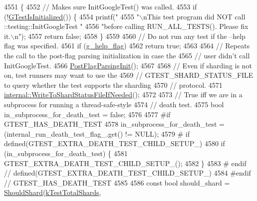 \begin{DoxyCode}
4551                                \{
4552   \textcolor{comment}{// Makes sure InitGoogleTest() was called.}
4553   \textcolor{keywordflow}{if} (!\hyperlink{namespacetesting_1_1internal_a91e707e0d371fae0224ffd37f0d042af}{GTestIsInitialized}()) \{
4554     printf(\textcolor{stringliteral}{"%
4555            \textcolor{stringliteral}{"\(\backslash\)nThis test program did NOT call ::testing::InitGoogleTest "}
4556            \textcolor{stringliteral}{"before calling RUN\_ALL\_TESTS().  Please fix it.\(\backslash\)n"});
4557     \textcolor{keywordflow}{return} \textcolor{keyword}{false};
4558   \}
4559 
4560   \textcolor{comment}{// Do not run any test if the --help flag was specified.}
4561   \textcolor{keywordflow}{if} (\hyperlink{namespacetesting_1_1internal_a93a772f5e51973b105d91cbb66a203f4}{g\_help\_flag})
4562     \textcolor{keywordflow}{return} \textcolor{keyword}{true};
4563 
4564   \textcolor{comment}{// Repeats the call to the post-flag parsing initialization in case the}
4565   \textcolor{comment}{// user didn't call InitGoogleTest.}
4566   \hyperlink{classtesting_1_1internal_1_1UnitTestImpl_a772894193104b1b2516f16e6ff813168}{PostFlagParsingInit}();
4567 
4568   \textcolor{comment}{// Even if sharding is not on, test runners may want to use the}
4569   \textcolor{comment}{// GTEST\_SHARD\_STATUS\_FILE to query whether the test supports the sharding}
4570   \textcolor{comment}{// protocol.}
4571   \hyperlink{namespacetesting_1_1internal_a19b35b39782d41e6ef76e1910a3a502e}{internal::WriteToShardStatusFileIfNeeded}();
4572 
4573   \textcolor{comment}{// True iff we are in a subprocess for running a thread-safe-style}
4574   \textcolor{comment}{// death test.}
4575   \textcolor{keywordtype}{bool} in\_subprocess\_for\_death\_test = \textcolor{keyword}{false};
4576 
4577 \textcolor{preprocessor}{#if GTEST\_HAS\_DEATH\_TEST}
4578   in\_subprocess\_for\_death\_test = (internal\_run\_death\_test\_flag\_.get() != NULL);
4579 \textcolor{preprocessor}{# if defined(GTEST\_EXTRA\_DEATH\_TEST\_CHILD\_SETUP\_)}
4580   \textcolor{keywordflow}{if} (in\_subprocess\_for\_death\_test) \{
4581     GTEST\_EXTRA\_DEATH\_TEST\_CHILD\_SETUP\_();
4582   \}
4583 \textcolor{preprocessor}{# endif  // defined(GTEST\_EXTRA\_DEATH\_TEST\_CHILD\_SETUP\_)}
4584 \textcolor{preprocessor}{#endif  // GTEST\_HAS\_DEATH\_TEST}
4585 
4586   \textcolor{keyword}{const} \textcolor{keywordtype}{bool} should\_shard = \hyperlink{namespacetesting_1_1internal_a0fe41657b1d1ab7ec4e37ec07403ee6c}{ShouldShard}(\hyperlink{namespacetesting_a7542311baba200ebabd4065717606f6e}{kTestTotalShards}, 
}
\end{DoxyCode}
